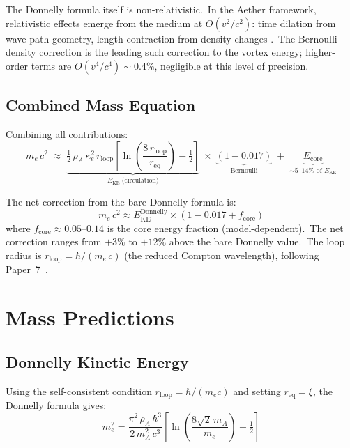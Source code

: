\documentclass[12pt,letterpaper]{article}
\newcommand{\rhoa}{\rho_{\!A}}
\newcommand{\rloop}{r_{\mathrm{loop}}}
\begin{document}
The Donnelly formula itself is non-relativistic.\ In the Aether framework,
relativistic effects emerge from the medium at $O(v^2/c^2)$: time dilation
from wave path geometry, length contraction from density changes
\cite{otto-relativity}.\ The Bernoulli density correction is the leading
such correction to the vortex energy; higher-order terms are
$O(v^4/c^4) \sim 0.4\%$, negligible at this level of precision.

\subsection{Combined Mass Equation}
\label{sec:combined}

Combining all contributions:
%
\begin{equation}
  \boxed{m_e\,c^2 \;\approx\;
  \underbrace{\tfrac{1}{2}\,\rhoa\,\kappa_e^2\,\rloop
  \left[\ln\!\left(\frac{8\,\rloop}{r_{\mathrm{eq}}}\right)
  - \tfrac{1}{2}\right]}_{\displaystyle E_{\mathrm{KE}}\;\text{(circulation)}}
  \;\times\;\underbrace{(1 - 0.017)}_{\text{Bernoulli}}
  \;+\; \underbrace{E_{\mathrm{core}}}_{\displaystyle\sim\!5\text{--}14\%
  \text{ of }E_{\mathrm{KE}}}}
  \label{eq:me-total}
\end{equation}

The net correction from the bare Donnelly formula is:
%
\begin{equation}
  m_e\,c^2 \approx E_{\mathrm{KE}}^{\mathrm{Donnelly}} \times
  (1 - 0.017 + f_{\mathrm{core}})
  \label{eq:net-correction}
\end{equation}
%
where $f_{\mathrm{core}} \approx 0.05$--$0.14$ is the core energy fraction
(model-dependent).\ The net correction ranges from $+3\%$ to $+12\%$
above the bare Donnelly value.\ The loop radius is
$\rloop = \hbar/(m_e\,c)$ (the reduced Compton wavelength), following
Paper~7~\cite{otto-quantum}.


\section{Mass Predictions}
\label{sec:predictions}

\subsection{Donnelly Kinetic Energy}
\label{sec:ke-only}

Using the self-consistent condition $\rloop = \hbar/(m_e c)$ and setting
$r_{\mathrm{eq}} = \xi$, the Donnelly formula gives:
%
\begin{equation}
  m_e^2 = \frac{\pi^2\,\rhoa\,\hbar^3}{2\,m_A^2\,c^3}
  \left[\ln\!\left(\frac{8\sqrt{2}\,m_A}{m_e}\right) - \tfrac{1}{2}\right]
  \label{eq:self-consistent}
\end{equation}
\end{document}
